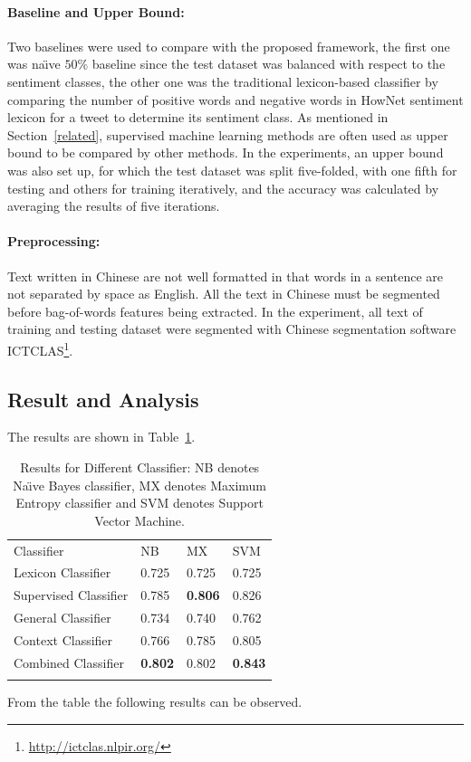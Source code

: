 \documentclass{llncs}
\begin{document}
\paragraph{Baseline and Upper Bound:}
Two baselines were used to compare with the proposed framework, the first one was na\"\i ve $ 50\% $ baseline since the test dataset was balanced with respect to the sentiment classes, the other one was the traditional lexicon-based classifier by comparing the number of positive words and negative words in HowNet sentiment lexicon for a tweet to determine its sentiment class.
As mentioned in Section~\ref{related}, supervised machine learning methods are often used as upper bound to be compared by other methods. 
In the experiments, an upper bound was also set up, for which the test dataset was split five-folded, with one fifth for testing and others for training iteratively, and the accuracy was calculated by averaging the results of five iterations.
\paragraph{Preprocessing:}
Text written in Chinese are not well formatted in that words in a sentence are not separated by space as English. 
All the text in Chinese must be segmented before bag-of-words features being extracted. 
In the experiment, all text of training and testing dataset were segmented with Chinese segmentation software ICTCLAS\footnote{\url{http://ictclas.nlpir.org/}}.

\subsection{Result and Analysis}
\label{result}

The results are shown in Table~\ref{t1}. 
\begin{table}
\caption{Results for Different Classifier: NB denotes Na\"\i ve Bayes classifier, MX denotes Maximum Entropy classifier and SVM denotes Support Vector Machine.}
\label{t1}
\centering
\begin{tabular}{llll}
\hline\noalign{\bigskip}
Classifier &   NB    &    MX    &    SVM    \\
\noalign{\bigskip}
\hline
\noalign{\bigskip}
Lexicon Classifier & 0.725 & 0.725 & 0.725 \\
Supervised Classifier & 0.785 & \textbf{0.806} & 0.826 \\
General Classifier & 0.734 &  0.740 & 0.762 \\
Context Classifier & 0.766 & 0.785 & 0.805 \\
Combined Classifier & \textbf{0.802} & 0.802 & \textbf{0.843} \\
\noalign{\bigskip}
\hline
\end{tabular}
\end{table}
From the table the following results can be observed.
\end{document}
